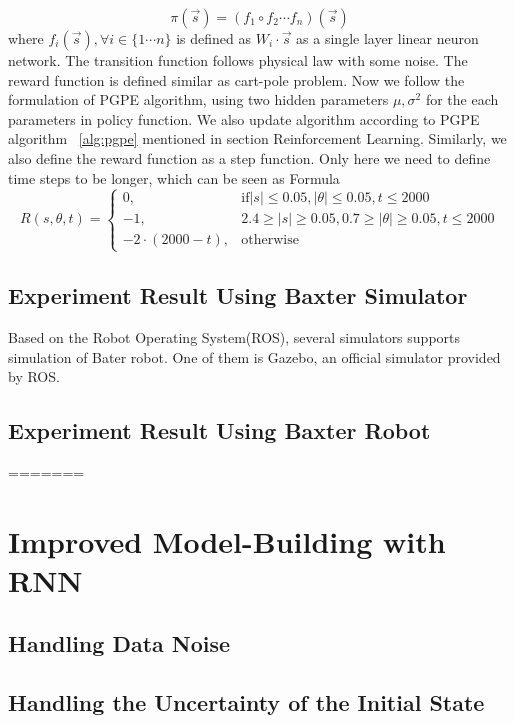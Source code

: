 \documentclass[officiallayout]{tktla}
\begin{document}
\begin{equation}
\pi(\vec{s}) = (f_1 \circ f_2 \cdots f_n)(\vec{s})
\end{equation} 
where $f_i(\vec{s}), \forall i \in \{1\cdots n\}$ is defined as $W_i \cdot \vec{s}$ as a single layer linear neuron network.
The transition function follows physical law with some noise. The reward function is defined similar as cart-pole problem.
Now we follow the formulation of PGPE algorithm, using two hidden parameters $\mu, \sigma^2$ for the each parameters in policy function. We also update algorithm according to PGPE algorithm ~\ref{alg:pgpe} mentioned in section Reinforcement Learning. Similarly, we also define the reward function as a step function. Only here we need to define time steps to be longer, which can be seen as Formula~
\begin{equation}
    R(s,\theta, t)= 
\begin{cases}
    0,				& \text{if} |s|\leq 0.05, |\theta| \leq 0.05, t \leq 2000\\
    -1,              & 2.4 \geq |s|\geq 0.05, 0.7 \geq |\theta| \geq 0.05, t \leq 2000 \\
    -2 \cdot (2000 - t), 		& \text{otherwise}
\end{cases}
\end{equation}

\subsection{Experiment Result Using Baxter Simulator}
Based on the Robot Operating System(ROS), several simulators supports simulation of Bater robot. One of them is Gazebo, an official simulator provided by ROS.
\subsection{Experiment Result Using Baxter Robot}
=======

\section{Improved Model-Building with RNN} 
\subsection{Handling Data Noise} 
\subsection{Handling the Uncertainty of the Initial State}
\end{document}
